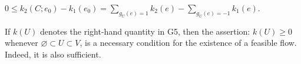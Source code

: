 $0 \leq k_2(C; e_0) - k_1(e_0) = \sum_{g_U(e) = 1} k_2(e) - \sum_{g_U(e) = -1} k_1(e).$

If $k(U)$ denotes the right-hand quantity in G5, then the assertion: $k(U) \geq 0$ whenever $\varnothing \subset U \subset V$, is a necessary condition for the existence of a feasible flow. Indeed, it is also sufficient.

